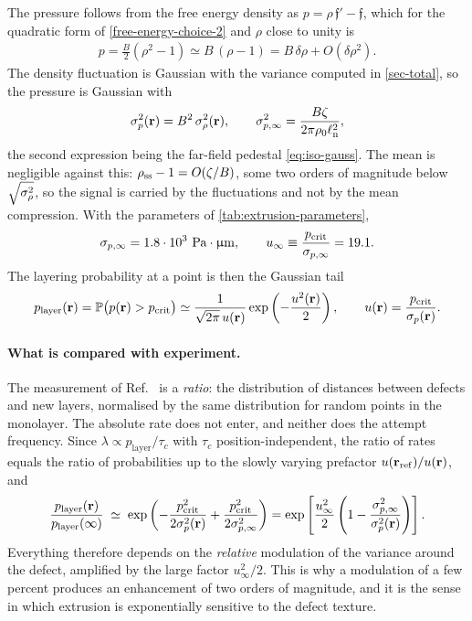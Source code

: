 \documentclass[a5paper]{article}
\begin{document}
The pressure follows from the free energy density as $p = \rho\,\mathfrak{f}' - \mathfrak{f}$, which for the quadratic form of \eqref{free-energy-choice-2} and $\rho$ close to unity is
\begin{align}
    \label{eq:pressure-of-rho}
    p = \frac{B}{2}\left(\rho^2-1\right) \simeq B\,(\rho-1) = B\,\delta\rho + O(\delta\rho^2).
\end{align}
The density fluctuation is Gaussian with the variance computed in \cref{sec-total}, so the pressure is Gaussian with
\begin{align}
    \label{eq:sigma-p}
    \sigma_p^2(\r) = B^2\,\sigmarho(\r),
    \qquad
    \sigma_{p,\infty}^2 = \frac{B\zeta}{2\pi\rho_0\elln^2},
\end{align}
the second expression being the far-field pedestal \eqref{eq:iso-gauss}. The mean is negligible against this: $\rho_\ss - 1 = O(\zeta/B)$, some two orders of magnitude below $\sqrt{\sigmarho}$, so the signal is carried by the fluctuations and not by the mean compression. With the parameters of \cref{tab:extrusion-parameters},
\begin{align}
    \sigma_{p,\infty} = 1.8\cdot10^{3}~\Pa\cdot\micron,
    \qquad
    u_\infty \equiv \frac{p_\crit}{\sigma_{p,\infty}} = 19.1 .
\end{align}
The layering probability at a point is then the Gaussian tail
\begin{align}
    \label{eq:p-layer}
    p_\text{layer}(\r) = \mathbb{P}\bigl(p(\r) > p_\crit\bigr)
    \simeq \frac{1}{\sqrt{2\pi}\,u(\r)}\exp\left(-\frac{u^2(\r)}{2}\right),
    \qquad
    u(\r) = \frac{p_\crit}{\sigma_p(\r)} .
\end{align}

\paragraph{What is compared with experiment.} The measurement of Ref.~\cite{copenhagen} is a \emph{ratio}: the distribution of distances between defects and new layers, normalised by the same distribution for random points in the monolayer. The absolute rate does not enter, and neither does the attempt frequency. Since $\lambda \propto p_\text{layer}/\tau_c$ with $\tau_c$ position-independent, the ratio of rates equals the ratio of probabilities up to the slowly varying prefactor $u(\r_\mathrm{ref})/u(\r)$, and
\begin{align}
    \label{eq:R-ratio}
    \frac{p_\text{layer}(\r)}{p_\text{layer}(\infty)}
    \;\simeq\;
    \exp\left(
        -\frac{p_\crit^2}{2\sigma_p^2(\r)}
        +\frac{p_\crit^2}{2\sigma_{p,\infty}^2}
    \right)
    = \exp\left[\frac{u_\infty^2}{2}\left(1 - \frac{\sigma_{p,\infty}^2}{\sigma_p^2(\r)}\right)\right].
\end{align}
Everything therefore depends on the \emph{relative} modulation of the variance around the defect, amplified by the large factor $u_\infty^2/2$. This is why a modulation of a few percent produces an enhancement of two orders of magnitude, and it is the sense in which extrusion is exponentially sensitive to the defect texture.
\end{document}
